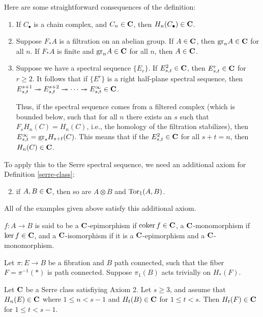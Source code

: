 Here are some straightforward consequences of the definition:
\begin{enumerate}
    \item If $C_\bullet$ is a chain complex, and $C_n\in \mathbf C$, then
	$H_n(C_\bullet)\in\mathbf C$.
    \item Suppose $F_\ast A$ is a filtration on an abelian group. If
	$A\in\mathbf C$, then $\mathrm{gr}_nA\in\mathbf C$ for all $n$. If $F_\ast A$ is finite
	and $\mathrm{gr}_n A\in\mathbf C$ for all $n$, then $A\in\mathbf C$.
    \item Suppose we have a spectral sequence $\{E_r\}$. If $E^2_{s,t}\in \mathbf C$,
	then $E^r_{s,t}\in \mathbf C$ for $r\geq 2$. It follows that if $\{E^r\}$ is
	a right half-plane spectral sequence, then $E^{s+1}_{s,t}\twoheadrightarrow
	E^{s+2}_{s,t}\twoheadrightarrow\cdots\twoheadrightarrow E^\infty_{s,t}\in\mathbf C$.

        Thus, if the spectral sequence comes from a filtered complex (which is
	bounded below, such that for all $n$ there exists an $s$ such that $F_s
	H_n(C) = H_n(C)$, i.e., the homology of the filtration stabilizes),
	then $E^\infty_{s,t} = \mathrm{gr}_s H_{s+t}(C)$. This means that if the
	$E^2_{s,t}\in\mathbf C$ for all $s+t = n$, then $H_n(C)\in\mathbf C$.
\end{enumerate}
To apply this to the Serre spectral sequence, we need an additional axiom for
Definition \ref{serre-class}:
\begin{enumerate}
	\setcounter{enumi}{1}
    \item if $A,B\in\mathbf C$, then so are $A\otimes B$ and $\operatorname{Tor}_1(A,B)$.
\end{enumerate}
All of the examples given above satisfy this additional axiom.
\begin{terminology}
    $f:A\to B$ is said to be a $\mathbf C$-epimorphism if $\operatorname{coker} f\in \mathbf C$, a
    $\mathbf C$-monomorphism if $\ker f\in\mathbf C$, and a $\mathbf C$-isomorphism if it is a
    $\mathbf C$-epimorphism and a $\mathbf C$-monomorphism.
\end{terminology}
\begin{prop}
    Let $\pi:E\to B$ be a fibration and $B$ path connected, such that the fiber
    $F = \pi^{-1}(\ast)$ is path connected. Suppose $\pi_1(B)$ acts trivially
    on $H_\ast(F)$.

    Let $\mathbf C$ be a Serre class satisfiying Axiom 2. Let $s\geq 3$, and assume
    that $H_n(E)\in\mathbf C$ where $1\leq n<s-1$ and $H_t(B)\in \mathbf C$ for $1\leq
    t<s$. Then $H_t(F)\in\mathbf C$ for $1\leq t<s-1$.
\end{prop}
